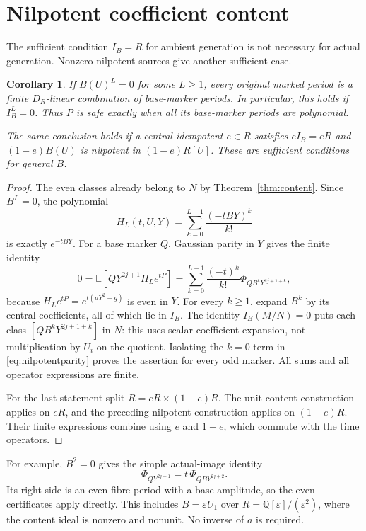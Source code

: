\documentclass[11pt]{article}
\newtheorem{corollary}[theorem]{Corollary}
\theoremstyle{definition}\newtheorem{definition}[theorem]{Definition}
\theoremstyle{remark}\newtheorem{remark}[theorem]{Remark}
\newcommand{\E}{\mathbb E}
\begin{document}
\section{Nilpotent coefficient content}
\label{sec:nilpotentcontent}

The sufficient condition $I_B=R$ for ambient generation is not
necessary for actual generation. Nonzero nilpotent sources give
another sufficient case.

\begin{corollary}\label{cor:nilpotentcontent}
If $B(U)^L=0$ for some $L\ge1$, every original marked period is a
finite $D_R$-linear combination of base-marker periods. In particular,
this holds if $I_B^L=0$. Thus $P$ is
safe exactly when all its base-marker periods are polynomial.

The same conclusion holds if a central idempotent $e\in R$ satisfies
$eI_B=eR$ and $(1-e)B(U)$ is nilpotent in $(1-e)R[U]$.
These are sufficient conditions for general $B$.
\end{corollary}
\begin{proof}
The even classes already belong to $N$ by Theorem~\ref{thm:content}.
Since $B^L=0$, the polynomial
\[
 H_L(t,U,Y)=\sum_{k=0}^{L-1}\frac{(-tBY)^k}{k!}
\]
is exactly $e^{-tBY}$. For a base marker $Q$, Gaussian parity in $Y$
gives the finite identity
\begin{equation}\label{eq:nilpotentparity}
 0=\E[QY^{2j+1}H_Le^{tP}]
   =\sum_{k=0}^{L-1}\frac{(-t)^k}{k!}
                \Phi_{QB^kY^{2j+1+k}},
\end{equation}
because $H_Le^{tP}=e^{t(aY^2+g)}$ is even in $Y$.
For every $k\ge1$, expand $B^k$ by its central coefficients, all
of which lie in $I_B$. The identity $I_B(M/N)=0$ puts each class
$[QB^kY^{2j+1+k}]$ in $N$: this uses scalar coefficient expansion,
not multiplication by $U_i$ on the quotient. Isolating the $k=0$
term in \eqref{eq:nilpotentparity} proves the assertion for every odd
marker. All sums and all operator expressions are finite.

For the last statement split $R=eR\times(1-e)R$. The unit-content
construction applies on $eR$, and the preceding nilpotent construction
applies on $(1-e)R$. Their finite expressions combine using $e$ and
$1-e$, which commute with the time operators.
\end{proof}

For example, $B^2=0$ gives the simple actual-image identity
\[
 \Phi_{QY^{2j+1}}=t\,\Phi_{QBY^{2j+2}}.
\]
Its right side is an even fibre period with a base amplitude, so the
even certificates apply directly. This includes $B=\varepsilon U_1$
over $R=\mathbb Q[\varepsilon]/(\varepsilon^2)$, where the content
ideal is nonzero and nonunit. No inverse of $a$ is required.
\end{document}
